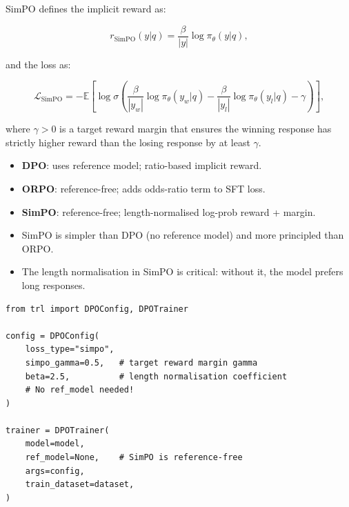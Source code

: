 SimPO defines the implicit reward as:

\[
r_{\text{SimPO}}(y|q) = \frac{\beta}{|y|} \log \pi_\theta(y|q),
\]

and the loss as:

\[
\boxed{
    \mathcal{L}_{\text{SimPO}} = -\mathbb{E}\!\left[
      \log \sigma\!\left(
        \frac{\beta}{|y_w|}\log\pi_\theta(y_w|q)
        - \frac{\beta}{|y_l|}\log\pi_\theta(y_l|q)
        - \gamma
      \right)
    \right],
  }
\]

where $\gamma > 0$ is a target reward margin that ensures the winning response has strictly higher reward than the losing response by at least $\gamma$.

\begin{keybox}
\begin{itemize}
  \item \textbf{DPO}: uses reference model; ratio-based implicit reward.
  \item \textbf{ORPO}: reference-free; adds odds-ratio term to SFT loss.
  \item \textbf{SimPO}: reference-free; length-normalised log-prob reward + margin.
  \item SimPO is simpler than DPO (no reference model) and more principled than ORPO.
  \item The length normalisation in SimPO is critical: without it, the model prefers long responses.
\end{itemize}
\end{keybox}

\begin{examplebox}
\begin{lstlisting}[style=pythonstyle]
from trl import DPOConfig, DPOTrainer

config = DPOConfig(
    loss_type="simpo",
    simpo_gamma=0.5,   # target reward margin gamma
    beta=2.5,          # length normalisation coefficient
    # No ref_model needed!
)

trainer = DPOTrainer(
    model=model,
    ref_model=None,    # SimPO is reference-free
    args=config,
    train_dataset=dataset,
)
\end{lstlisting}
\end{examplebox}

